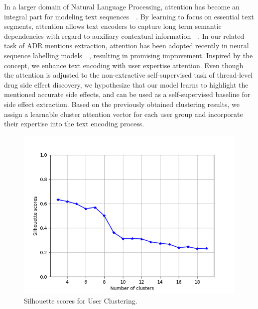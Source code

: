 \documentclass{bmcart}
\begin{document}
In a larger domain of Natural Language Processing, attention has become an integral part for modeling text sequences~\cite{luong2015effective}~\cite{vaswani2017attention}. By learning to focus on essential text segments, attention allows text encoders to capture long term semantic dependencies with regard to auxiliary contextual information~\cite{chen2016neural}~\cite{feng2019attention}. 
In our related task of ADR mentions extraction, attention has been adopted recently in neural sequence labelling models~\cite{ding2018attentive}~\cite{ramamoorthy2018attentive}, 
resulting in promising improvement. 
Inspired by the concept, we enhance text encoding with user expertise attention. Even though the attention is adjusted to the non-extractive self-supervised task of thread-level drug side effect discovery, we hypothesize that our model learns to highlight the mentioned accurate side effects, and can be used as a self-supervised baseline for side effect extraction. Based on the previously obtained clustering results, we assign a learnable cluster attention vector for each user group and incorporate their expertise into the text encoding process.

\begin{figure}[t!]
    \centering
    \captionsetup{justification=centering}
    \includegraphics[scale=0.5]{k_means.png}
    \caption[Silhouette scores for user clustering]{Silhouette scores for User Clustering.}
    \label{fig:KMeans}
\end{figure}
\end{document}

